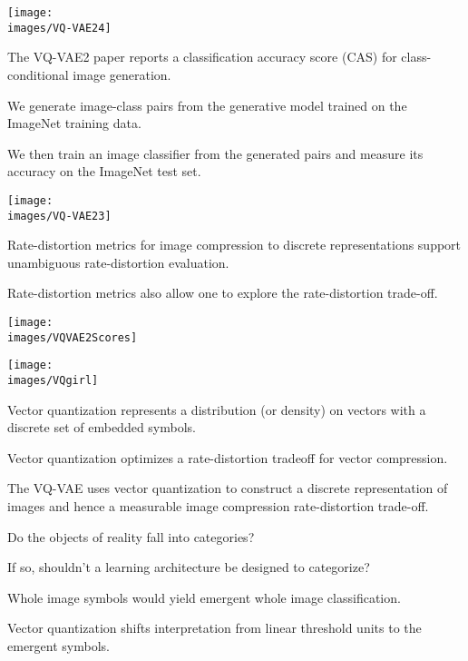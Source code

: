 {
\centerline{\texttt{[image: \\images/VQ-VAE24]}}


The VQ-VAE2 paper reports a classification accuracy score (CAS) for class-conditional image generation.

\vfill
We generate image-class pairs from the generative model trained on the ImageNet training data.

\vfill
We then train an image classifier from the generated pairs and measure its accuracy on the ImageNet test set.

\vfill
\centerline{\texttt{[image: \\images/VQ-VAE23]}}


Rate-distortion metrics for image compression to discrete representations support unambiguous rate-distortion evaluation.

\vfill
Rate-distortion metrics also allow one to explore the rate-distortion trade-off.

\vfill
\centerline{\texttt{[image: \\images/VQVAE2Scores]}}


\vfill
\centerline{\texttt{[image: \\images/VQgirl]}}



Vector quantization represents a distribution (or density) on vectors with a discrete set of embedded symbols.

\vfill
Vector quantization optimizes a rate-distortion tradeoff for vector compression.

\vfill
The VQ-VAE uses vector quantization to construct a discrete representation of images and hence a measurable image compression rate-distortion trade-off.


Do the objects of reality fall into categories?

\vfill
If so, shouldn't a learning architecture be designed to categorize?

\vfill
Whole image symbols would yield emergent whole image classification.


Vector quantization shifts interpretation from linear threshold units to the emergent symbols.

}
